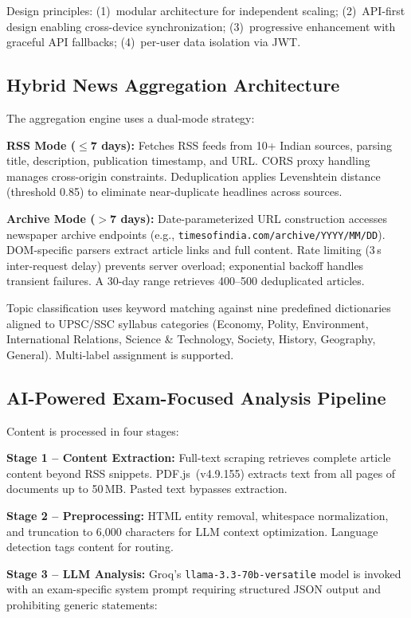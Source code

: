 \documentclass[conference]{IEEEtran}
\begin{document}
Design principles: (1)~modular architecture for independent scaling; (2)~API-first design enabling cross-device synchronization; (3)~progressive enhancement with graceful API fallbacks; (4)~per-user data isolation via JWT.

\subsection{Hybrid News Aggregation Architecture}
The aggregation engine uses a dual-mode strategy:

\textbf{RSS Mode ($\leq$7 days):} Fetches RSS feeds from 10+ Indian sources, parsing title, description, publication timestamp, and URL. CORS proxy handling manages cross-origin constraints. Deduplication applies Levenshtein distance (threshold 0.85) to eliminate near-duplicate headlines across sources.

\textbf{Archive Mode ($>$7 days):} Date-parameterized URL construction accesses newspaper archive endpoints (e.g., \texttt{timesofindia.com/archive/YYYY/MM/DD}). DOM-specific parsers extract article links and full content. Rate limiting (3\,s inter-request delay) prevents server overload; exponential backoff handles transient failures. A 30-day range retrieves 400–500 deduplicated articles.

Topic classification uses keyword matching against nine predefined dictionaries aligned to UPSC/SSC syllabus categories (Economy, Polity, Environment, International Relations, Science \& Technology, Society, History, Geography, General). Multi-label assignment is supported.

\subsection{AI-Powered Exam-Focused Analysis Pipeline}
Content is processed in four stages:

\textbf{Stage 1 – Content Extraction:} Full-text scraping retrieves complete article content beyond RSS snippets. PDF.js~(v4.9.155) extracts text from all pages of documents up to 50\,MB. Pasted text bypasses extraction.

\textbf{Stage 2 – Preprocessing:} HTML entity removal, whitespace normalization, and truncation to 6{,}000 characters for LLM context optimization. Language detection tags content for routing.

\textbf{Stage 3 – LLM Analysis:} Groq's \texttt{llama-3.3-70b-versatile} model is invoked with an exam-specific system prompt requiring structured JSON output and prohibiting generic statements:
\end{document}
